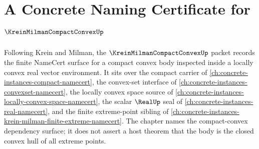 \chapter{A Concrete Naming Certificate for $\KreinMilmanCompactConvexUp$}
\label{ch:concrete-instances-krein-milman-compact-convex-namecert}

Following Krein and Milman, the $\KreinMilmanCompactConvexUp$ packet records the finite NameCert surface for a compact convex body inspected inside a locally convex real vector environment. It sits over the compact carrier of \autoref{ch:concrete-instances-compact-namecert}, the convex-set interface of \autoref{ch:concrete-instances-convexset-namecert}, the locally convex space source of \autoref{ch:concrete-instances-locally-convex-space-namecert}, the scalar $\RealUp$ seal of \autoref{ch:concrete-instances-real-namecert}, and the finite extreme-point sibling of \autoref{ch:concrete-instances-krein-milman-finite-extreme-namecert}. The chapter names the compact-convex dependency surface; it does not assert a host theorem that the body is the closed convex hull of all extreme points.

